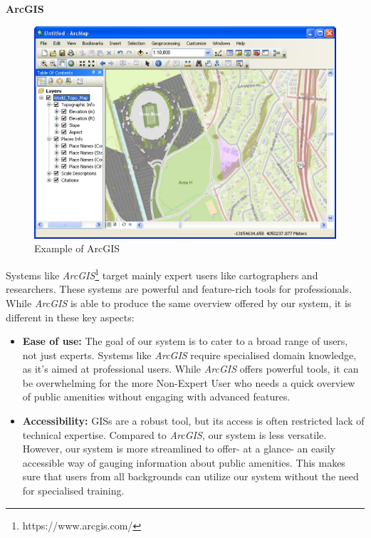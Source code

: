 \noindent{}\textbf{ArcGIS}

\begin{figure}[h]
  \centering
  \includegraphics[width=0.85\columnwidth]{images/arcgis.png}
  \caption{Example of ArcGIS}
  \label{fig:arcgis}
\end{figure}

\noindent{}Systems like \textit{ArcGIS}\footnote{https://www.arcgis.com/} target
mainly expert users like cartographers and researchers. These systems are powerful
and feature-rich tools for professionals. While \textit{ArcGIS} is able to produce
the same overview offered by our system, it is different in these key aspects:

\begin{samepage}
\begin{itemize}
    \item{\textbf{Ease of use:} The goal of our system is to cater to a broad
    range of users, not just experts. Systems like \textit{ArcGIS} require
    specialised domain knowledge, as it's aimed at professional users. While
    \textit{ArcGIS} offers powerful tools, it can be overwhelming for the more
    Non-Expert User who needs a quick overview of public amenities without engaging
    with advanced features.}
  \vspace{1.25mm}

  \item{\textbf{Accessibility:} GISs are a robust tool, but its access is often
  restricted lack of technical expertise. Compared to \textit{ArcGIS}, our
  system is less versatile. However, our system is more streamlined to offer- at
  a glance- an easily accessible way of gauging information about public
  amenities. This makes sure that users from all backgrounds can utilize our
  system without the need for specialised training.}
  \vspace{1.25mm}

\end{itemize}
\end{samepage}

\pagebreak{}